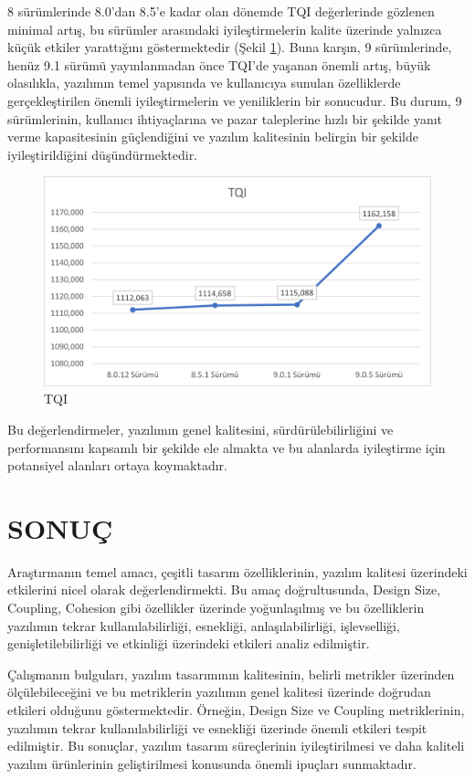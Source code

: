 \documentclass[conference]{IEEEtran}
\begin{document}
8 sürümlerinde 8.0'dan 8.5'e kadar olan dönemde TQI değerlerinde gözlenen minimal artış, bu sürümler arasındaki iyileştirmelerin kalite üzerinde yalnızca küçük etkiler yarattığını göstermektedir (Şekil \ref{sekil4}). Buna karşın, 9 sürümlerinde, henüz 9.1 sürümü yayınlanmadan önce TQI'de yaşanan önemli artış, büyük olasılıkla, yazılımın temel yapısında ve kullanıcıya sunulan özelliklerde gerçekleştirilen önemli iyileştirmelerin ve yeniliklerin bir sonucudur. Bu durum, 9 sürümlerinin, kullanıcı ihtiyaçlarına ve pazar taleplerine hızlı bir şekilde yanıt verme kapasitesinin güçlendiğini ve yazılım kalitesinin belirgin bir şekilde iyileştirildiğini düşündürmektedir.

\begin{figure}[h]
	\centering
	\includegraphics[scale=0.6]{tqi.png}
	\caption{TQI}
	\label{sekil4}
\end{figure}

Bu değerlendirmeler, yazılımın genel kalitesini, sürdürülebilirliğini ve performansını kapsamlı bir şekilde ele almakta ve bu alanlarda iyileştirme için potansiyel alanları ortaya koymaktadır.

\section{SONUÇ}

Araştırmanın temel amacı, çeşitli tasarım özelliklerinin, yazılım kalitesi üzerindeki etkilerini nicel olarak değerlendirmekti. Bu amaç doğrultusunda, Design Size, Coupling, Cohesion gibi özellikler üzerinde yoğunlaşılmış ve bu özelliklerin yazılımın tekrar kullanılabilirliği, esnekliği, anlaşılabilirliği, işlevselliği, genişletilebilirliği ve etkinliği üzerindeki etkileri analiz edilmiştir.

Çalışmanın bulguları, yazılım tasarımının kalitesinin, belirli metrikler üzerinden ölçülebileceğini ve bu metriklerin yazılımın genel kalitesi üzerinde doğrudan etkileri olduğunu göstermektedir. Örneğin, Design Size ve Coupling metriklerinin, yazılımın tekrar kullanılabilirliği ve esnekliği üzerinde önemli etkileri tespit edilmiştir. Bu sonuçlar, yazılım tasarım süreçlerinin iyileştirilmesi ve daha kaliteli yazılım ürünlerinin geliştirilmesi konusunda önemli ipuçları sunmaktadır.
\end{document}
